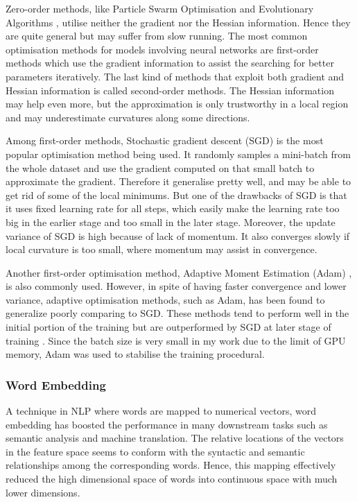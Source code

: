 \documentclass[12pt]{report}
\begin{document}
Zero-order methods, like Particle Swarm Optimisation \cite{kennedy_particle_1995} and Evolutionary Algorithms \cite{angeline_evolutionary_1998}, utilise neither the gradient nor the Hessian information. Hence they are quite general but may suffer from slow running. The most common optimisation methods for models involving neural networks are first-order methods which use the gradient information to assist the searching for better parameters iteratively.
The last kind of methods that exploit both gradient and Hessian information is called second-order
methods. The Hessian information may help even more, but the approximation is only trustworthy in a local region and may underestimate curvatures along some directions.

Among first-order methods, Stochastic gradient descent (SGD) \cite{robbins_stochastic_1951} is the most popular optimisation method being used. It randomly samples a mini-batch from the whole dataset and use the gradient computed on that small batch to approximate the gradient. Therefore it generalise pretty well, and may be able to get rid of some of the local minimums. But
one of the drawbacks of SGD is that it uses fixed learning rate for all steps, which easily make the learning rate too big in the earlier stage and too small in the later stage. Moreover, the update variance of SGD is high because of lack of momentum. It also converges slowly if local curvature is too small, where momentum may assist in convergence.

Another first-order optimisation method, Adaptive Moment Estimation (Adam) \cite{kingma_adam:_2014}, is also commonly used. However, in spite of having faster convergence and lower variance, adaptive optimisation methods, such as Adam, has been found to generalize poorly comparing to SGD. These methods tend to perform well in the initial portion of the training but are outperformed by SGD at later stage of training \cite{wilson_marginal_2017}. Since the batch size is very small in my work due to the limit of GPU memory, Adam was used to stabilise the training procedural.

\subsubsection{Word Embedding}
A technique in NLP where words are mapped to numerical vectors, word embedding has boosted the performance in many downstream tasks such as semantic analysis and machine translation. The relative locations of the vectors in the feature space seems to conform with the syntactic and semantic relationships among the corresponding words.  Hence, this mapping effectively reduced the high dimensional space of words into continuous space with much lower dimensions.
\end{document}
